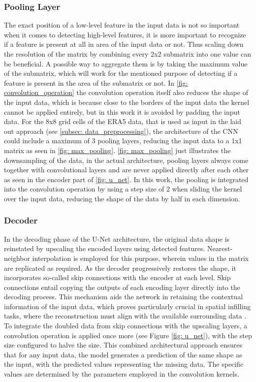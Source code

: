 \subsubsection*{Pooling Layer}

The exact position of a low-level feature in the input data is not so important when it comes to detecting high-level features,
it is more important to recognize if a feature is present at all in area of the input data or not.
Thus scaling down the resolution of the matrix by combining every 2x2 submatrix into one value can be beneficial.
A possible way to aggregate them is by taking the maximum value of the submatrix, which will work for the mentioned purpose of detecting if a feature is present in the area of the submatrix or not. In \autoref{fig: convolution_operation} the convolution operation itself also reduces the shape of the input data, which is because close to the borders of the input data the kernel cannot be applied entirely, but in this work it is avoided by padding the input data. For the 8x8 grid cells of the ERA5 data, that is used as input in the laid out approach (see \autoref{subsec: data_preprocessing}), the architecture of the CNN could include a maximum of 3 pooling layers, reducing the input data to a 1x1 matrix as seen in \autoref{fig: max_pooling}. \autoref{fig: max_pooling} just illustrates the downsampling of the data, in the actual architecture, pooling layers always come together with convolutional layers and are never applied directly after each other as seen in the encoder part of \autoref{fig: u_net}.
In this work, the pooling is integrated into the convolution operation by using a step size of 2 when sliding the kernel over the input data, reducing the shape of the data by half in each dimension.

\subsubsection*{Decoder}

In the decoding phase of the U-Net architecture, the original data shape is reinstated by upscaling the encoded layers using detected features. Nearest-neighbor interpolation is employed for this purpose, wherein values in the matrix are replicated as required.
As the decoder progressively restores the shape, it incorporates so-called skip connections with the encoder at each level. Skip connections entail copying the outputs of each encoding layer directly into the decoding process.
This mechanism aids the network in retaining the contextual information of the input data, which proves particularly crucial in spatial infilling tasks, where the reconstruction must align with the available surrounding data \cite{liu2018inpaining}.
To integrate the doubled data from skip connections with the upscaling layers, a convolution operation is applied once more (see Figure \ref{fig: u_net}), with the step size configured to halve the size.
This combined architectural approach ensures that for any input data, the model generates a prediction of the same shape as the input, with the predicted values representing the missing data.
The specific values are determined by the parameters employed in the convolution kernels.

